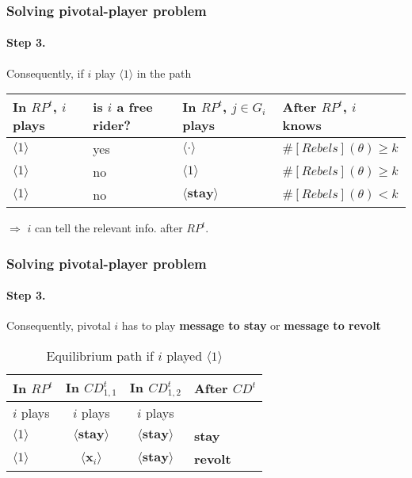 \documentclass[9pt]{beamer}
\begin{document}
\begin{frame}
  \frametitle{Solving pivotal-player problem}
\framesubtitle{Step 3.}

Consequently, if $i$ play $\langle 1 \rangle$ in the path

\begin{table}[h]
\begin{tabular}{l l l l}
In $RP^t$, $i$ plays  & is $i$ a free rider?  & In $RP^t$, $j\in G_i$ plays & After $RP^t$, $i$ knows \\
\hline
\hline
$\langle 1 \rangle$ & yes  & $\langle \cdot \rangle$ & $\#[Rebels](\theta)\geq k$ \\ \pause
$\langle 1 \rangle$&   no  & $\langle 1 \rangle$ & $\#[Rebels](\theta)\geq k$ \\ \pause
$\langle 1 \rangle$&   no  & $\langle \textbf{stay} \rangle$ & $\#[Rebels](\theta)< k$ \\

\end{tabular}
\end{table}

$\Rightarrow$ $i$ can tell the relevant info. after $RP^t$.
\end{frame}


\begin{frame}
  \frametitle{Solving pivotal-player problem}
\framesubtitle{Step 3.}

Consequently, pivotal $i$ \alert{has to} play \textbf{message to stay} or \textbf{message to revolt}

\begin{table}[ht]
\caption{Equilibrium path if $i$ played $\langle 1 \rangle$}
\label{Table_blf_up_cdt12}
\begin{center}
\begin{tabular}{l c c l}
In $RP^t$ 	 	&  	In $CD^t_{1,1}$		&  In $CD^t_{1,2}$	 & After $CD^t$\\
\hline
\hline
$i$ plays 		                             &  	$i$ plays		&				$i$ plays			& \\
\hline
$\langle 1 \rangle$ 		             &  \alert{$\langle \textbf{stay} \rangle$}	&	$\langle \textbf{stay} \rangle$ & \textbf{stay}\\
$\langle 1 \rangle$ 		             &  $\langle \mathbf{x}_i \rangle$	&	\alert{${\langle \textbf{stay} \rangle}$} & \textbf{revolt}\\
\end{tabular}
\end{center}
\end{table}
\end{frame}
\end{document}
